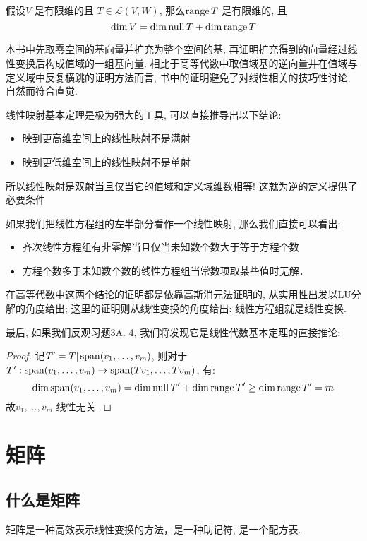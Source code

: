 \begin{theorem}
    假设\(V\) 是有限维的且 \(T \in \mathscr{L}(V,W)\), 那么\(\operatorname{range}
    T\) 是有限维的, 且\[
        \dim V = \dim \operatorname{null} T + \dim \operatorname{range} T
    \]
\end{theorem}

本书中先取零空间的基向量并扩充为整个空间的基, 再证明扩充得到的向量经过线性变换后构成值域的一组基向量.
相比于高等代数中取值域基的逆向量并在值域与定义域中反复横跳的证明方法而言, 书中的证明避免了对线性相关的技巧性讨论, 自然而符合直觉.

线性映射基本定理是极为强大的工具, 可以直接推导出以下结论:

\begin{itemize}
    \item 映到更高维空间上的线性映射不是满射
    \item 映到更低维空间上的线性映射不是单射
\end{itemize}
所以线性映射是双射当且仅当它的值域和定义域维数相等! 这就为逆的定义提供了必要条件

如果我们把线性方程组的左半部分看作一个线性映射, 那么我们直接可以看出:
\begin{itemize}
    \item 齐次线性方程组有非零解当且仅当未知数个数大于等于方程个数
    \item 方程个数多于未知数个数的线性方程组当常数项取某些值时无解．
\end{itemize}

在高等代数中这两个结论的证明都是依靠高斯消元法证明的, 从实用性出发以LU分解的角度给出;
这里的证明则从线性变换的角度给出: 线性方程组就是线性变换.

最后, 如果我们反观习题3A. 4, 我们将发现它是线性代数基本定理的直接推论:
\begin{proof}
    记\(T^{\prime}= T|\operatorname{span}(v_{1}, \dots, v_{m})\),
    则对于\(T^{\prime}: \operatorname{span}(v_{1}, \dots, v_{m}) \to
    \operatorname{span}(Tv_{1}, \dots, Tv_{m})\), 有:
    \[
        \dim \operatorname{span}(v_{1}, \dots, v_{m}) = \dim \operatorname{null} T^{\prime} +
        \dim \operatorname{range} T^{\prime} \geq \dim \operatorname{range} T^{\prime} = m
    \]
    故\(v_{1}, \dots, v_{m}\) 线性无关.
\end{proof}
\section{矩阵}
\subsection{什么是矩阵}
矩阵是一种高效表示线性变换的方法，是一种助记符, 是一个配方表.

